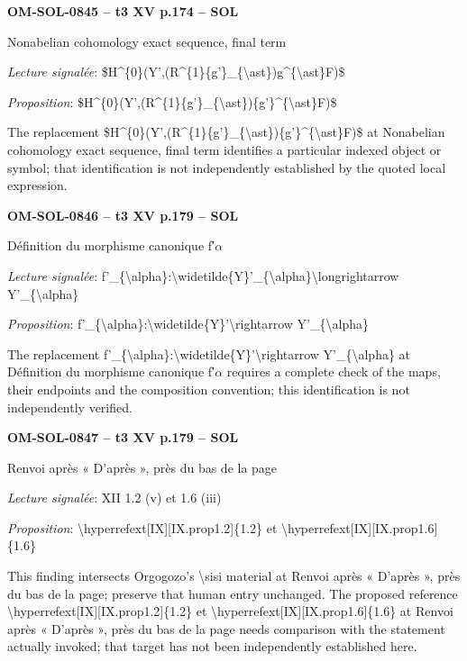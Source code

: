 \par\noindent\textbf{OM-SOL-0845 -- t3 XV p.174 -- SOL}\par
Nonabelian cohomology exact sequence, final term\par
\emph{Lecture signalée}: \$H\textasciicircum{}\{0\}(Y',(R\textasciicircum{}\{1\}\{g'\}\_\{\textbackslash{}ast\})g\textasciicircum{}\{\textbackslash{}ast\}F)\$\par
\emph{Proposition}: \$H\textasciicircum{}\{0\}(Y',(R\textasciicircum{}\{1\}\{g'\}\_\{\textbackslash{}ast\})\{g'\}\textasciicircum{}\{\textbackslash{}ast\}F)\$\par
The replacement \$H\textasciicircum{}\{0\}(Y',(R\textasciicircum{}\{1\}\{g'\}\_\{\textbackslash{}ast\})\{g'\}\textasciicircum{}\{\textbackslash{}ast\}F)\$ at Nonabelian cohomology exact sequence, final term identifies a particular indexed object or symbol; that identification is not independently established by the quoted local expression.\par
\par\noindent\textbf{OM-SOL-0846 -- t3 XV p.179 -- SOL}\par
Définition du morphisme canonique f′\ensuremath{\alpha}\par
\emph{Lecture signalée}: f'\_\{\textbackslash{}alpha\}:\textbackslash{}widetilde\{Y\}'\_\{\textbackslash{}alpha\}\textbackslash{}longrightarrow Y'\_\{\textbackslash{}alpha\}\par
\emph{Proposition}: f'\_\{\textbackslash{}alpha\}:\textbackslash{}widetilde\{Y\}'\textbackslash{}rightarrow Y'\_\{\textbackslash{}alpha\}\par
The replacement f'\_\{\textbackslash{}alpha\}:\textbackslash{}widetilde\{Y\}'\textbackslash{}rightarrow Y'\_\{\textbackslash{}alpha\} at Définition du morphisme canonique f′\ensuremath{\alpha} requires a complete check of the maps, their endpoints and the composition convention; this identification is not independently verified.\par
\par\noindent\textbf{OM-SOL-0847 -- t3 XV p.179 -- SOL}\par
Renvoi après « D'après », près du bas de la page\par
\emph{Lecture signalée}: XII 1.2 (v) et 1.6 (iii)\par
\emph{Proposition}: \textbackslash{}hyperrefext[IX][IX.prop1.2]\{1.2\} et \textbackslash{}hyperrefext[IX][IX.prop1.6]\{1.6\}\par
This finding intersects Orgogozo's \textbackslash{}sisi material at Renvoi après « D'après », près du bas de la page; preserve that human entry unchanged. The proposed reference \textbackslash{}hyperrefext[IX][IX.prop1.2]\{1.2\} et \textbackslash{}hyperrefext[IX][IX.prop1.6]\{1.6\} at Renvoi après « D'après », près du bas de la page needs comparison with the statement actually invoked; that target has not been independently established here.\par
